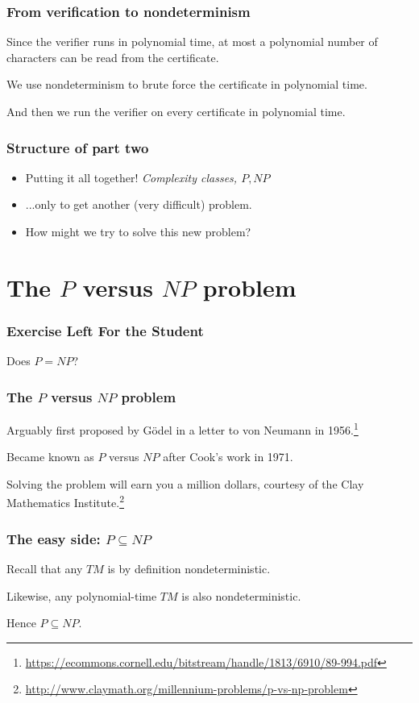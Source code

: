 \documentclass[aspectratio=169]{beamer}
\begin{document}
\begin{frame}
\frametitle{From verification to nondeterminism}
Since the verifier runs in polynomial time, at most a polynomial number of characters can be read from the certificate.

We use nondeterminism to brute force the certificate in polynomial time.

And then we run the verifier on every certificate in polynomial time.
\end{frame}

\begin{frame}
\frametitle{Structure of part two}
\begin{itemize}
    \item Putting it all together! {\em Complexity classes, $P, NP$}
    \item ...only to get another (very difficult) problem.
    \item How might we try to solve this new problem?
\end{itemize}
\end{frame}

\section{The $P$ versus $NP$ problem}

\begin{frame}
\frametitle{Exercise Left For the Student}
\centerline{Does $P=NP$?}
\end{frame}

\begin{frame}
\frametitle{The $P$ versus $NP$ problem}
Arguably first proposed by G\"{o}del in a letter to von Neumann in 1956.\footnote{\url{https://ecommons.cornell.edu/bitstream/handle/1813/6910/89-994.pdf}}

Became known as $P$ versus $NP$ after Cook's work in 1971.

Solving the problem will earn you a million dollars, courtesy of the Clay Mathematics Institute.\footnote{\url{http://www.claymath.org/millennium-problems/p-vs-np-problem}}
\end{frame}

\begin{frame}
\frametitle{The easy side: $P \subseteq NP$}

Recall that any $TM$ is by definition nondeterministic.

Likewise, any polynomial-time $TM$ is also nondeterministic.

Hence $P \subseteq NP$.
\end{frame}
\end{document}
